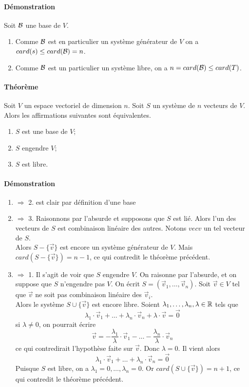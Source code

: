 \paragraph{Démonstration} Soit $\mathcal{B}$ une base de $V$.
\begin{enumerate}
  \item Comme $\mathcal{B}$ est en particulier un système générateur de $V$ on a $card(s) \leq card(\mathcal{B}) = n$.
  \item Comme $\mathcal{B}$ est un particulier un système libre, on a $n = card(\mathcal{B}) \leq card(T)$.
\end{enumerate}

\paragraph{Théorème} Soit $V$ un espace vectoriel de dimension $n$. Soit $S$ un système de $n$ vecteurs de $V$. Alors les affirmations suivantes sont équivalentes.
\begin{enumerate}
  \item $S$ est une base de $V$;
  \item $S$ engendre $V$;
  \item $S$ est libre.
\end{enumerate}

\paragraph{Démonstration}
\begin{enumerate}
  \item $\Rightarrow$ 2. est clair par définition d'une base
  \item $\Rightarrow$ 3. Raisonnons par l'absurde et supposons que $S$ est lié. Alors l'un des vecteurs de $S$ est combinaison linéaire des autres. Notons $vec{v}$ un tel vecteur de $S$. \\
    Alors $S - \{ \vec{v}\}$ est encore un système générateur de $V$. Mais $card(S - \{\vec{v}\}) = n-1$, ce qui contredit le théorème précédent.
  \item $\Rightarrow$ 1. Il s'agit de voir que $S$ engendre $V$. On raisonne par l'absurde, et on suppose que $S$ n'engendre pas $V$. On écrit $S = (\vec{v}_1, \ldots, \vec{v}_n)$. Soit $\vec{v} \in V$ tel que $\vec{v}$ ne soit pas combinaison linéaire des $\vec{v}_i$. \\
    Alors le système $S \cup \{ \vec{v}\}$ est encore libre. Soient $\lambda_1, \ldots, \lambda_n, \lambda \in \mathbb{R}$ tels que 
    $$\lambda_1 \cdot \vec{v}_1 + \ldots + \lambda_n \cdot \vec{v}_n + \lambda \cdot \vec{v} = \vec{0}$$
    si $\lambda \neq 0$, on pourrait écrire 
    $$\vec{v} = -\frac{\lambda_1}{\lambda} \cdot \vec{v}_1 - \ldots - \frac{\lambda_n}{\lambda} \cdot \vec{v}_n$$
    ce qui contredirait l'hypothèse faite sur $\vec{v}$. Donc $\lambda = 0$. Il vient alors
    $$\lambda_1 \cdot \vec{v}_1 + \ldots + \lambda_n  \cdot \vec{v}_n = \vec{0}$$
    Puisque $S$ est libre, on a $\lambda_1 = 0, \ldots, \lambda_n = 0$. Or $card(S \cup \{\vec{v}\} ) = n+1$, ce qui contredit le théorème précédent.
\end{enumerate}


